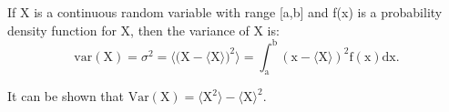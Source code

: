 If X is a continuous random variable with range [a,b] and f(x) is a probability
density function for X, then the variance of X is:
\[ \mathrm{var(X)} = \sigma ^2
= \langle \mathrm{(X - } \langle \mathrm{X} \rangle
) ^2 \rangle =
\int _{\mathrm{a}} ^{\mathrm{b}}
( \mathrm{x} - \langle \mathrm{X} \rangle ) ^2
\mathrm{f(x)dx} . \]
\par
It can be shown that $ \mathrm{Var(X)} = \langle \mathrm{X} ^2 \rangle
- \langle \mathrm{X} \rangle ^2 . $
